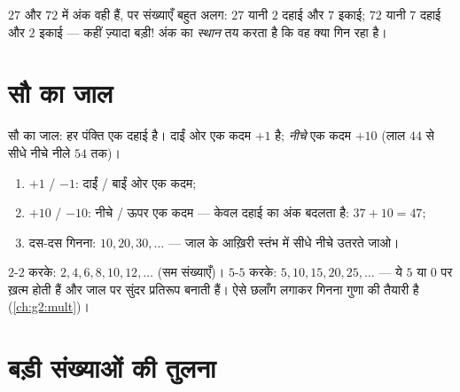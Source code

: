 \begin{example}[एक ही अंक, अलग संख्याएँ]\label{ex:g1:tens:place}
$27$ और $72$ में अंक वही हैं, पर संख्याएँ बहुत अलग: $27$ यानी
$2$ दहाई और $7$ इकाई; $72$ यानी $7$ दहाई और $2$ इकाई --- कहीं
ज़्यादा बड़ी! अंक का \emph{स्थान} तय करता है कि वह क्या गिन रहा है।
\end{example}

\section{सौ का जाल}

\begin{omfigure}

{\small सौ का जाल: हर पंक्ति एक दहाई है। दाईं ओर एक कदम
$+1$ है; \emph{नीचे} एक कदम $+10$ (लाल $44$ से सीधे नीचे
नीले $54$ तक)।}
\end{omfigure}

\begin{method}[जाल पर चलना]\label{met:g1:tens:grid}
\begin{enumerate}
  \item $+1$ / $-1$: दाईं / बाईं ओर एक कदम;
  \item $+10$ / $-10$: नीचे / ऊपर एक कदम --- केवल दहाई का अंक
        बदलता है: $37 + 10 = 47$;
  \item दस-दस गिनना: $10, 20, 30, \dots$ --- जाल के आख़िरी
        स्तंभ में सीधे नीचे उतरते जाओ।
\end{enumerate}
\end{method}

\begin{example}[2-2 और 5-5 गिनना]\label{ex:g1:tens:skip}
$2$-$2$ करके: $2, 4, 6, 8, 10, 12, \dots$ (सम संख्याएँ)।
$5$-$5$ करके: $5, 10, 15, 20, 25, \dots$ --- ये $5$ या $0$ पर
ख़त्म होती हैं और जाल पर सुंदर प्रतिरूप बनाती हैं। ऐसे छलाँग लगाकर
गिनना गुणा की तैयारी है (\cref{ch:g2:mult})।
\end{example}

\section{बड़ी संख्याओं की तुलना}

